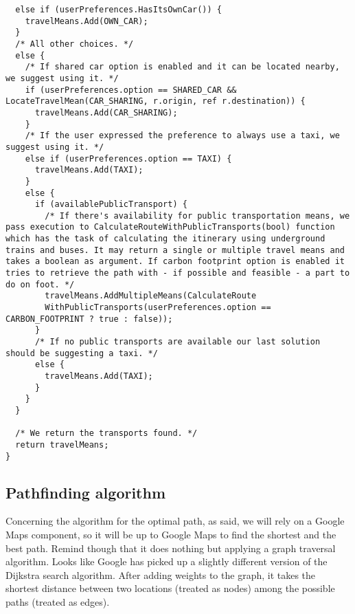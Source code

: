 \begin{tcolorbox}
\begin{verbatim}
  else if (userPreferences.HasItsOwnCar()) {
    travelMeans.Add(OWN_CAR);
  }
  /* All other choices. */
  else {
    /* If shared car option is enabled and it can be located nearby, we suggest using it. */
    if (userPreferences.option == SHARED_CAR && LocateTravelMean(CAR_SHARING, r.origin, ref r.destination)) {
      travelMeans.Add(CAR_SHARING);
    }
    /* If the user expressed the preference to always use a taxi, we suggest using it. */
    else if (userPreferences.option == TAXI) {
      travelMeans.Add(TAXI);    
    }
    else {
      if (availablePublicTransport) {
        /* If there's availability for public transportation means, we pass execution to CalculateRouteWithPublicTransports(bool) function which has the task of calculating the itinerary using underground trains and buses. It may return a single or multiple travel means and takes a boolean as argument. If carbon footprint option is enabled it tries to retrieve the path with - if possible and feasible - a part to do on foot. */
        travelMeans.AddMultipleMeans(CalculateRoute
        WithPublicTransports(userPreferences.option == CARBON_FOOTPRINT ? true : false));
      }
      /* If no public transports are available our last solution should be suggesting a taxi. */
      else {
        travelMeans.Add(TAXI);
      }
    }
  }

  /* We return the transports found. */
  return travelMeans;
}

\end{verbatim}
\end{tcolorbox}
\subsection*{Pathfinding algorithm}
Concerning the algorithm for the optimal path, as said, we will rely on a Google Maps component, so it will be up to Google Maps to find the shortest and the best path. Remind though that it does nothing but applying a graph traversal algorithm. Looks like Google has picked up a slightly different version of the Dijkstra search algorithm\cite{maps}. After adding weights to the graph, it takes the shortest distance between two locations (treated as nodes) among the possible paths (treated as edges).


